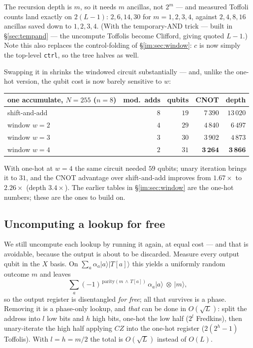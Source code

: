 \documentclass[11pt]{article}
\renewcommand{\ket}[1]{\lvert #1 \rangle}
\newcommand{\code}[1]{\texttt{#1}}
\theoremstyle{plain}
\theoremstyle{remark}
\begin{document}
\noindent
The recursion depth is $m$, so it needs $m$ ancillas, not $2^m$ --- and measured Toffoli counts
land exactly on $2(L-1)$: $2,6,14,30$ for $m=1,2,3,4$, against $2,4,8,16$ ancillas saved down to
$1,2,3,4$. (With the temporary-AND trick \cite{gidney-and} --- built in \S\ref{sec:tempand} --- the uncompute Toffolis become Clifford, giving
quoted $L-1$.) Note this also replaces the control-folding of \S\ref{im:sec:window}: $c$ is now simply
the top-level \code{ctrl}, so the tree halves as well.

Swapping it in shrinks the windowed circuit substantially --- and, unlike the one-hot version,
the qubit cost is now barely sensitive to $w$:

\begin{center}\small
\begin{tabular}{@{}lrrrr@{}}
\toprule
one accumulate, $N=255$ ($n=8$) & mod.\ adds & qubits & CNOT & depth\\
\midrule
shift-and-add               & $8$ & $19$ & $7\,390$ & $13\,020$\\
window $w=2$                & $4$ & $29$ & $4\,840$ & $6\,497$\\
window $w=3$                & $3$ & $30$ & $3\,902$ & $4\,873$\\
window $w=4$                & $2$ & $31$ & $\mathbf{3\,264}$ & $\mathbf{3\,866}$\\
\bottomrule
\end{tabular}
\end{center}

\noindent
With one-hot at $w=4$ the same circuit needed $59$ qubits; unary iteration brings it to $31$, and
the CNOT advantage over shift-and-add improves from $1.67\times$ to $2.26\times$ (depth
$3.4\times$). The earlier tables in \S\ref{im:sec:window} are the one-hot numbers; these are the ones
to build on.

\subsection{Uncomputing a lookup for free}\label{im:sec:mbu}

We still uncompute each lookup by running it again, at equal cost --- and that is avoidable,
because the output is about to be discarded. Measure every output qubit in the $X$ basis. On
$\sum_a\alpha_a\ket a\ket{T[a]}$ this yields a uniformly random outcome $m$ and leaves
\[
\sum_a (-1)^{\,\mathrm{parity}(m\,\wedge\,T[a])}\,\alpha_a\ket a\ \otimes\ \ket m ,
\]
so the output register is disentangled \emph{for free}; all that survives is a phase. Removing it
is a phase-only lookup, and \emph{that} can be done in $O(\sqrt L)$: split the address into $l$ low
bits and $h$ high bits, one-hot the low half ($2^l$ Fredkins), then unary-iterate the high half
applying $CZ$ into the one-hot register ($2(2^h{-}1)$ Toffolis). With $l=h=m/2$ the total is
$O(\sqrt L)$ instead of $O(L)$.
\end{document}
